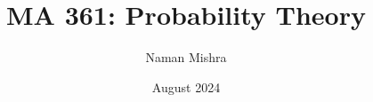 \documentclass[12pt]{report}
\title{MA 361: Probability Theory}
\author{Naman Mishra}
\date{August 2024}
\begin{document}
\maketitle
\tableofcontents
\listoflecture
    
    
    
    
    
    
    
    
    
    
    
    
    
    
    
\end{document}
